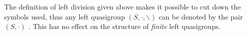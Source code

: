\documentclass{mcom-l}
\begin{document}

    



\noindent The definition of left division given above makes it possible to cut down the symbols used, thus any left quasigroup $(S, \cdot, \backslash)$ can be denoted by the pair $(S, \cdot)$ \cite{bonatto2021malcev, bonatto2022medial}. \newline This has no effect on the structure of \emph{finite} left quasigroups. \newline
\end{document}
